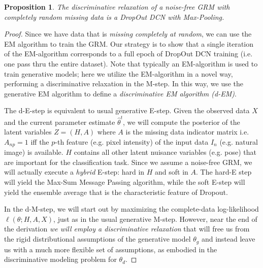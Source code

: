 \documentclass[12pt]{article}
\newtheorem{proposition}[theorem]{Proposition}
\begin{document}
\begin{proposition} \label{prop:GRM-DropOut}
The discriminative relaxation of a noise-free GRM with completely random missing data is a DropOut DCN\cite{dahl2013improving} with Max-Pooling.
\end{proposition}\begin{proof}
Since we have data that is \emph{missing completely at random}, we can use the EM algorithm to train the GRM\cite{bishop2006pattern}. Our strategy is to show that a single iteration of the EM-algorithm corresponds to a full epoch of DropOut DCN training (i.e. one pass thru the entire dataset). Note that typically an EM-algorithm is used to train generative models; here we utilize the EM-algorithm in a novel way, performing a discriminative relaxation in the M-step. In this way, we use the generative EM algorithm to define a \emph{discriminative EM algorithm (d-EM)}.

The d-E-step is equivalent to usual generative E-step. Given the observed data $X$ and the current parameter estimate $\hat{\theta}^{t}$, we will compute the posterior of the latent variables $Z = (H,A)$ where $A$ is the missing data indicator matrix i.e. $A_{np} = 1$ iff the $p$-th feature (e.g. pixel intensity) of the input data $I_{n}$ (e.g. natural image) is available. $H$ contains all other latent nuisance variables (e.g. pose) that are important for the classification task. Since we assume a noise-free GRM, we will actually execute a \emph{hybrid} E-step: hard in $H$ and soft in $A$. The hard-E step will yield the Max-Sum Message Passing algorithm, while the soft E-step will yield the ensemble average that is the characteristic feature of Dropout\cite{dahl2013improving}.

\sloppy
In the d-M-step, we will start out by maximizing the complete-data log-likelihood $\ell(\theta; H,A,X)$, just as in the usual generative M-step. However, near the end of the derivation \emph{we will employ a discriminative relaxation} that will free us from the rigid distributional assumptions of the generative model  $\theta_{g}$ and instead leave us with a much more flexible set of assumptions, as embodied in the discriminative modeling problem for $\theta_{d}$.  



\end{proof}
\end{document}
